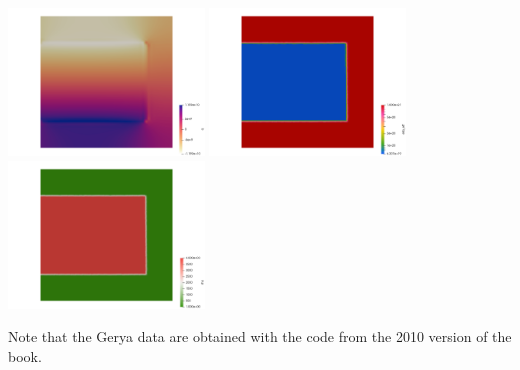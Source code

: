 \begin{center}
\includegraphics[width=5.2cm]{python_codes/fieldstone_64/results/slab/init/q}
\includegraphics[width=5.2cm]{python_codes/fieldstone_64/results/slab/init/etaeff}
\includegraphics[width=5.2cm]{python_codes/fieldstone_64/results/slab/init/rho}
\end{center}

Note that the Gerya data are obtained with the code from the 2010 version of the book.

